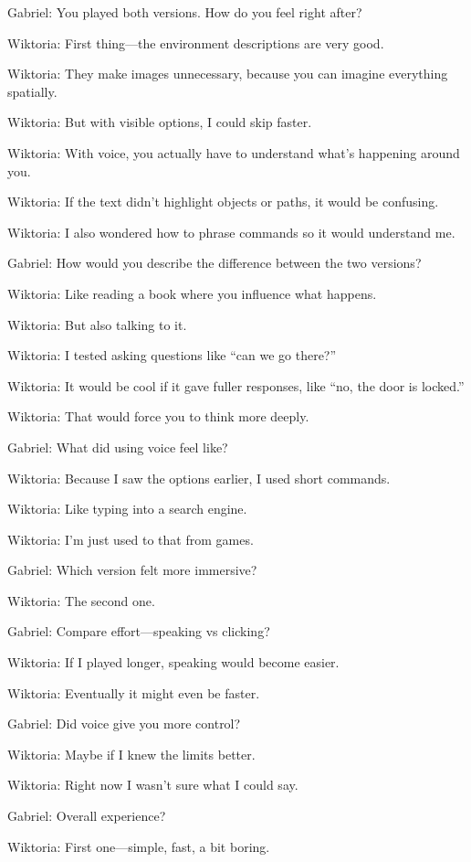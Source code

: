 Gabriel: You played both versions. How do you feel right after?

Wiktoria: First thing—the environment descriptions are very good.

Wiktoria: They make images unnecessary, because you can imagine everything spatially.

Wiktoria: But with visible options, I could skip faster.

Wiktoria: With voice, you actually have to understand what’s happening around you.

Wiktoria: If the text didn’t highlight objects or paths, it would be confusing.

Wiktoria: I also wondered how to phrase commands so it would understand me.

Gabriel: How would you describe the difference between the two versions?

Wiktoria: Like reading a book where you influence what happens.

Wiktoria: But also talking to it.

Wiktoria: I tested asking questions like “can we go there?”

Wiktoria: It would be cool if it gave fuller responses, like “no, the door is locked.”

Wiktoria: That would force you to think more deeply.

Gabriel: What did using voice feel like?

Wiktoria: Because I saw the options earlier, I used short commands.

Wiktoria: Like typing into a search engine.

Wiktoria: I’m just used to that from games.

Gabriel: Which version felt more immersive?

Wiktoria: The second one.

Gabriel: Compare effort—speaking vs clicking?

Wiktoria: If I played longer, speaking would become easier.

Wiktoria: Eventually it might even be faster.

Gabriel: Did voice give you more control?

Wiktoria: Maybe if I knew the limits better.

Wiktoria: Right now I wasn’t sure what I could say.

Gabriel: Overall experience?

Wiktoria: First one—simple, fast, a bit boring.

